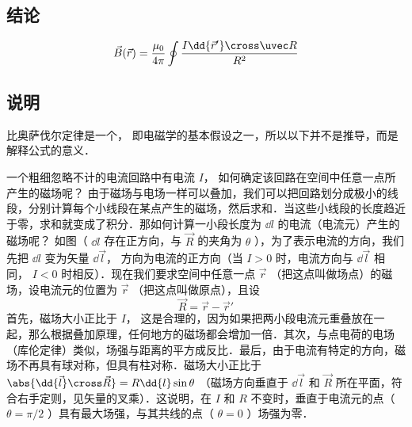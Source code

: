 
\subsection{结论}
\begin{equation}
\vec B(\vec r) = \frac{\mu _0}{4\pi} \oint \frac{I \dd{\vec r'} \cross \uvec R}{R^2}
\end{equation}
\subsection{说明}
比奥萨伐尔定律是一个， 即电磁学的基本假设之一，所以以下并不是推导，而是解释公式的意义．

一个粗细忽略不计的电流回路中有电流 $I$， 如何确定该回路在空间中任意一点所产生的磁场呢？ 由于磁场与电场一样可以叠加，我们可以把回路划分成极小的线段，分别计算每个小线段在某点产生的磁场，然后求和．当这些小线段的长度趋近于零，求和就变成了积分．那如何计算一小段长度为 $\dd{l}$ 的电流（电流元）产生的磁场呢？ 如图（%
 $\dd{l}$ 存在正方向，与 $\vec R$ 的夹角为 $\theta$ ），为了表示电流的方向，我们先把 $\dd{l}$ 变为矢量 $\dd{\vec l}$， 方向为电流的正方向（当 $I > 0$ 时，电流方向与 $\dd{\vec l}$ 相同， $I < 0$ 时相反）．现在我们要求空间中任意一点 $\vec r$ （把这点叫做场点）的磁场，设电流元的位置为 $\vec r$ （把这点叫做原点），且设
\begin{equation}
\vec R = \vec r - \vec r'
\end{equation}
首先，磁场大小正比于 $I$， 这是合理的，因为如果把两小段电流元重叠放在一起，那么根据叠加原理，任何地方的磁场都会增加一倍．其次，与点电荷的电场（库伦定律）类似，场强与距离的平方成反比．最后，由于电流有特定的方向，磁场不再具有球对称，但具有柱对称．磁场大小正比于 $\abs{\dd{\vec l} \cross \vec R} = R \dd{l} \sin\theta $ （磁场方向垂直于 $\dd{\vec l}$ 和 $\vec R$ 所在平面，符合右手定则，见矢量的叉乘）．这说明，在 $I$ 和 $R$ 不变时，垂直于电流元的点（ $\theta  = \pi /2$ ）具有最大场强，与其共线的点（ $\theta  = 0$ ）场强为零．

